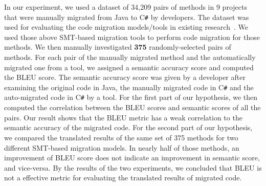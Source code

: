 In our experiment, we used a dataset of 34,209 pairs of methods
in 9 projects that were manually migrated from Java to
C\texttt{\#} by developers. The dataset was used for evaluating the
code migration models/tools in existing research~\cite{ase15}. We used
those above SMT-based migration tools to perform code migration for
those methods. We then manually investigated {\bf 375}
randomly-selected pairs of methods. For each pair of the manually
migrated method and the automatically migrated one from a tool, we
assigned a semantic accuracy score and computed the BLEU score. The
semantic accuracy score was given by a developer after examining the
original code in Java, the manually migrated code in C\texttt{\#} and
the auto-migrated code in C\texttt{\#} by a tool. For the first part
of our hypothesis, we then computed the correlation between the BLEU
scores and semantic scores of all the pairs. Our result shows that the
BLEU metric has a weak correlation to the semantic accuracy of the
migrated code. For the second part of our hypothesis, we compared the
translated results of the same set of 375 methods for two different
SMT-based migration models. In nearly half of those methods, an
improvement of BLEU score does not indicate an improvement in semantic
score, and vice-versa.
By the results of the two experiments, we concluded that BLEU is not a 
effective metric for evaluating the translated results of migrated code. 

